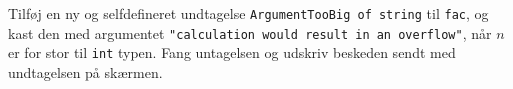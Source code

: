\label{fac} Tilføj en ny og selfdefineret undtagelse \lstinline{ArgumentTooBig of string} til \lstinline{fac}, og kast den med argumentet \lstinline{"calculation would result in an overflow"}, når $n$ er for stor til \lstinline{int} typen. Fang untagelsen og udskriv beskeden sendt med undtagelsen på skærmen.